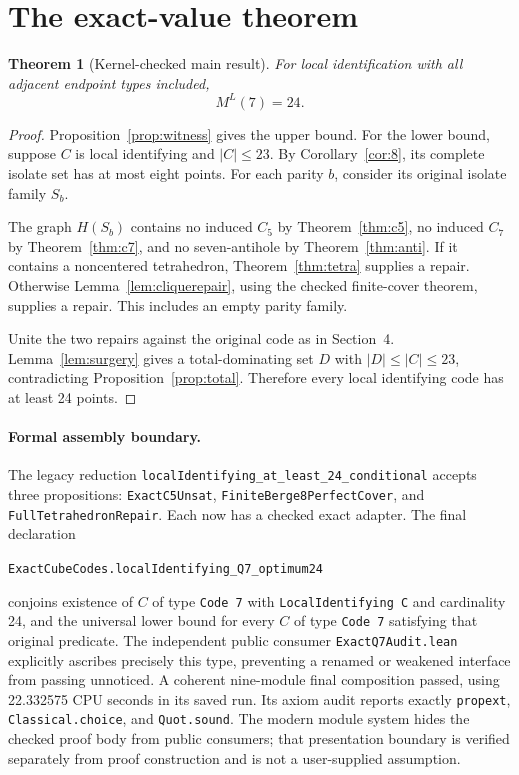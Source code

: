 \documentclass[11pt]{article}
\newtheorem{theorem}{Theorem}[section]
\theoremstyle{definition}\newtheorem{definition}[theorem]{Definition}
\theoremstyle{remark}\newtheorem{remark}[theorem]{Remark}
\newcommand{\card}[1]{\lvert #1\rvert}
\newcommand{\src}[1]{{\small\nolinkurl{#1}}}
\begin{document}
\section{The exact-value theorem}
\begin{theorem}[Kernel-checked main result]\label{thm:main}
For local identification with all adjacent endpoint types included,
\[
 M^L(7)=24.
\]
\end{theorem}
\begin{proof}
Proposition~\ref{prop:witness} gives the upper bound. For the lower bound, suppose $C$ is local identifying and $\card C\le23$. By Corollary~\ref{cor:8}, its complete isolate set has at most eight points. For each parity $b$, consider its original isolate family $S_b$.

The graph $H(S_b)$ contains no induced $C_5$ by Theorem~\ref{thm:c5}, no induced $C_7$ by Theorem~\ref{thm:c7}, and no seven-antihole by Theorem~\ref{thm:anti}. If it contains a noncentered tetrahedron, Theorem~\ref{thm:tetra} supplies a repair. Otherwise Lemma~\ref{lem:cliquerepair}, using the checked finite-cover theorem, supplies a repair. This includes an empty parity family.

Unite the two repairs against the original code as in Section~4. Lemma~\ref{lem:surgery} gives a total-dominating set $D$ with $\card D\le\card C\le23$, contradicting Proposition~\ref{prop:total}. Therefore every local identifying code has at least 24 points.
\end{proof}

\paragraph{Formal assembly boundary.}
The legacy reduction \src{localIdentifying_at_least_24_conditional} accepts three propositions: \src{ExactC5Unsat}, \src{FiniteBerge8PerfectCover}, and \src{FullTetrahedronRepair}. Each now has a checked exact adapter. The final declaration
\begin{center}\src{ExactCubeCodes.localIdentifying_Q7_optimum24}\end{center}
conjoins existence of $C$ of type \src{Code 7} with \src{LocalIdentifying C} and cardinality 24, and the universal lower bound for every $C$ of type \src{Code 7} satisfying that original predicate. The independent public consumer \src{ExactQ7Audit.lean} explicitly ascribes precisely this type, preventing a renamed or weakened interface from passing unnoticed. A coherent nine-module final composition passed, using 22.332575 CPU seconds in its saved run. Its axiom audit reports exactly \src{propext}, \src{Classical.choice}, and \src{Quot.sound}. The modern module system hides the checked proof body from public consumers; that presentation boundary is verified separately from proof construction and is not a user-supplied assumption.
\end{document}
